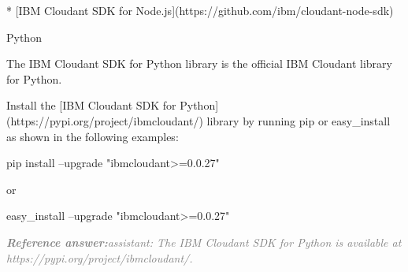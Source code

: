 \documentclass[a4paper,11pt]{article}
\begin{document}
\begin{docenv}
{* [IBM Cloudant SDK for Node.js](https://github.com/ibm/cloudant-node-sdk)









 Python 

The IBM Cloudant SDK for Python library is the official IBM Cloudant library for Python.

Install the [IBM Cloudant SDK for Python](https://pypi.org/project/ibmcloudant/) library by running pip or easy\_install as shown in the following examples:

pip install --upgrade "ibmcloudant>=0.0.27"

or

easy\_install --upgrade "ibmcloudant>=0.0.27"}
\end{docenv}
\begin{refanswerenv}
{\footnotesize\textit{\textcolor{gray}{\textbf{Reference answer:}\enspace assistant: The IBM Cloudant SDK for Python is available at https://pypi.org/project/ibmcloudant/.}}}
\end{refanswerenv}
\end{document}
